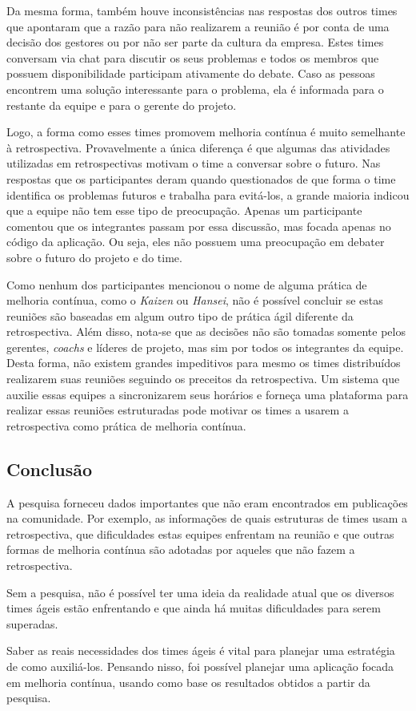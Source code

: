 Da mesma forma, também houve inconsistências nas respostas dos outros times que apontaram que a razão para não realizarem a reunião é por conta de uma decisão dos gestores ou por não ser parte da cultura da empresa. Estes times conversam via chat para discutir os seus problemas e todos os membros que possuem disponibilidade participam ativamente do debate. Caso as pessoas encontrem uma solução interessante para o problema, ela é informada para o restante da equipe e para o gerente do projeto. 

Logo, a forma como esses times promovem melhoria contínua é muito semelhante à retrospectiva. Provavelmente a única diferença é que algumas das atividades utilizadas em retrospectivas motivam o time a conversar sobre o futuro. Nas respostas que os participantes deram quando questionados de que forma o time identifica os problemas futuros e trabalha para evitá-los, a grande maioria indicou que a equipe não tem esse tipo de preocupação. Apenas um participante comentou que os integrantes passam por essa discussão, mas focada apenas no código da aplicação. Ou seja, eles não possuem uma preocupação em debater sobre o futuro do projeto e do time.

Como nenhum dos participantes mencionou o nome de alguma prática de melhoria contínua, como o \textit{Kaizen} ou \textit{Hansei}, não é possível concluir se estas reuniões são baseadas em algum outro tipo de prática ágil diferente da retrospectiva. Além disso, nota-se que as decisões não são tomadas somente pelos gerentes, \textit{coachs} e líderes de projeto, mas sim por todos os integrantes da equipe. Desta forma, não existem grandes impeditivos para mesmo os times distribuídos realizarem suas reuniões seguindo os preceitos da retrospectiva. Um sistema que auxilie essas equipes a sincronizarem seus horários e forneça uma plataforma para realizar essas reuniões estruturadas pode motivar os times a usarem a retrospectiva como prática de melhoria contínua.

\subsection{Conclusão}

A pesquisa forneceu dados importantes que não eram encontrados em publicações na comunidade. Por exemplo, as informações de quais estruturas de times usam a retrospectiva, que dificuldades estas equipes enfrentam na reunião e que outras formas de melhoria contínua são adotadas por aqueles que não fazem a retrospectiva.

Sem a pesquisa, não é possível ter uma ideia da realidade atual que os diversos times ágeis estão enfrentando e que ainda há muitas dificuldades para serem superadas. 

Saber as reais necessidades dos times ágeis é vital para planejar uma estratégia de como auxiliá-los. Pensando nisso, foi possível planejar uma aplicação focada em melhoria contínua, usando como base os resultados obtidos a partir da pesquisa.